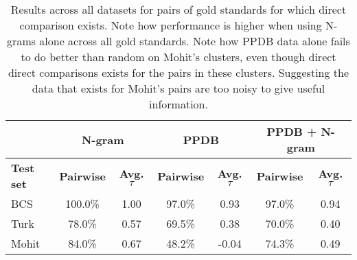 \begin{table}
\small
\centering
\begin{tabular}{|l|cc|cc|cc|}
	\hline 
	& \multicolumn{2}{c|}{N-gram} 
	& \multicolumn{2}{c|}{PPDB} 
	& \multicolumn{2}{c|}{PPDB + N-gram} \\
	\hline 
	\bf Test set
	& \bf Pairwise & \bf Avg. $\tau$ 
	& \bf Pairwise & \bf Avg. $\tau$ 
	& \bf Pairwise & \bf Avg. $\tau$ \\
	\hline
	BCS   & 100.0\% & 1.00 & 97.0\% &  0.93 & 97.0\% & 0.94 \\
	Turk  & 78.0\%  & 0.57 & 69.5\% &  0.38 & 70.0\% & 0.40 \\
	Mohit & 84.0\%  & 0.67 & 48.2\% & -0.04 & 74.3\% & 0.49 \\
	\hline
\end{tabular}
\caption{\label{font-table} Results across all datasets for pairs of gold standards for which direct comparison exists. Note how performance is higher when using N-grams alone across all gold standards. Note how PPDB data alone fails to do better than random on Mohit's clusters, even though direct direct comparisons exists for the pairs in these clusters. Suggesting the data that exists for Mohit's pairs are too noisy to give useful information. }
\end{table}\newpage




























